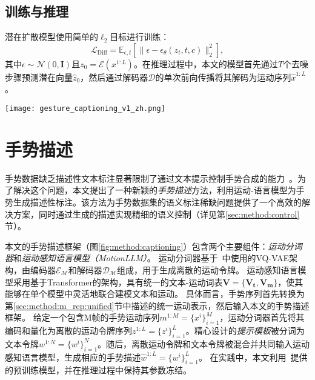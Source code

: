 \subsection{训练与推理}
潜在扩散模型使用简单的$\ell_2$目标进行训练\cite{ho2020ddpm, chen2023executing}：
\begin{equation}
  \mathcal{L}_{\text{Diff}} = \mathbb{E}_{\epsilon,t}[\|\epsilon - \epsilon_\theta(z_t, t, c)\|_2^2],
\end{equation}
其中$\epsilon \sim \mathcal{N}(0,\mathbf{I})$且$z_0 = \mathcal{E}(x^{1:L})$。在推理过程中，本文的模型首先通过$T$个去噪步骤预测潜在向量$\hat{z}_0$，然后通过解码器$\mathcal{D}$的单次前向传播将其解码为运动序列$\hat{x}^{1:L}$。

\begin{figure*}[t]
  \centering
  \texttt{[image: gesture\_captioning\_v1\_zh.png]}
  \caption{手势描述生成框架。本文的手势描述生成框架包含两个主要组件:
  运动分词器和运动感知语言模型。运动分词器将手势序列编码为离散的运动token序列,运动感知语
  言模型则基于这些token和提示模板生成对应的手势描述。}
  \label{fig:method:captioning}
\end{figure*}

\section{手势描述}
\label{sec:method:caption}
手势数据缺乏描述性文本标注显著限制了通过文本提示控制手势合成的能力~\cite{chen2024syntalker}。为了解决这个问题，本文提出了一种新颖的\textit{手势描述}方法，利用运动-语言模型为手势生成描述性标注。该方法为手势数据集的语义标注稀缺问题提供了一个高效的解决方案，同时通过生成的描述实现精细的语义控制（详见第\ref{sec:method:control}节）。

本文的手势描述框架（图\ref{fig:method:captioning}）包含两个主要组件：\textit{运动分词器}和\textit{运动感知语言模型（MotionLLM）}。
运动分词器基于~\cite{guo2022tm2t,zhang2023t2mgpt}中使用的VQ-VAE架构，由编码器$\mathcal{E_M}$和解码器$\mathcal{D_M}$组成，用于生成离散的运动令牌。
运动感知语言模型采用基于Transformer的架构，具有统一的文本-运动词表$\mathbf{V} = \{\mathbf{V_t}, \mathbf{V_m}\}$，使其能够在单个模型中灵活地联合建模文本和运动。
具体而言，手势序列首先转换为第\ref{sec:method:m_rep:unified}节中描述的统一运动表示，然后输入本文的手势描述框架。
给定一个包含M帧的手势运动序列$m^{1:M}=\{x^i\}^M_{i=1}$，运动分词器首先将其编码和量化为离散的运动令牌序列$z^{1:L}=\{z^i\}^L_{i=1}$。精心设计的\textit{提示模板}被分词为文本令牌$w^{1:N}=\{w^i\}^N_{i=1}$。随后，离散运动令牌和文本令牌被混合并共同输入运动感知语言模型，生成相应的手势描述$\hat{w}^{1:L}=\{w^i\}^L_{i=1}$。
在实践中，本文利用~\cite{jiang2024motiongpt}提供的预训练模型，并在推理过程中保持其参数冻结。

